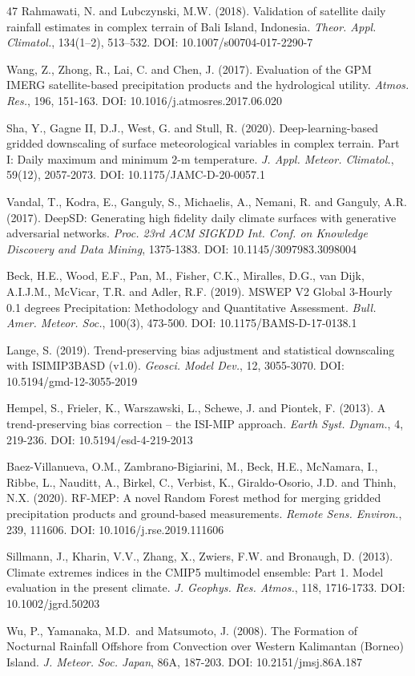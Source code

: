 \documentclass[11pt,a4paper]{article}
\begin{document}
\begin{thebibliography}{47}
 Rahmawati, N. and Lubczynski, M.W. (2018). Validation of
satellite daily rainfall estimates in complex terrain of Bali Island,
Indonesia. \emph{Theor. Appl. Climatol.}, 134(1--2), 513--532. DOI:
10.1007/s00704-017-2290-7

 Wang, Z., Zhong, R., Lai, C. and Chen, J. (2017). Evaluation of
the GPM IMERG satellite-based precipitation products and the
hydrological utility. \emph{Atmos. Res.}, 196, 151-163. DOI:
10.1016/j.atmosres.2017.06.020

 Sha, Y., Gagne II, D.J., West, G. and Stull, R. (2020).
Deep-learning-based gridded downscaling of surface meteorological
variables in complex terrain. Part I: Daily maximum and minimum 2-m
temperature. \emph{J. Appl. Meteor. Climatol.}, 59(12), 2057-2073. DOI:
10.1175/JAMC-D-20-0057.1

 Vandal, T., Kodra, E., Ganguly, S., Michaelis, A., Nemani, R.
and Ganguly, A.R. (2017). DeepSD: Generating high fidelity daily climate
surfaces with generative adversarial networks. \emph{Proc. 23rd ACM
SIGKDD Int. Conf. on Knowledge Discovery and Data Mining}, 1375-1383.
DOI: 10.1145/3097983.3098004

 Beck, H.E., Wood, E.F., Pan, M., Fisher, C.K., Miralles, D.G.,
van Dijk, A.I.J.M., McVicar, T.R. and Adler, R.F. (2019). MSWEP V2
Global 3-Hourly 0.1 degrees Precipitation: Methodology and Quantitative
Assessment. \emph{Bull. Amer. Meteor. Soc.}, 100(3), 473-500. DOI:
10.1175/BAMS-D-17-0138.1

 Lange, S. (2019). Trend-preserving bias adjustment and
statistical downscaling with ISIMIP3BASD (v1.0). \emph{Geosci. Model
Dev.}, 12, 3055-3070. DOI: 10.5194/gmd-12-3055-2019

 Hempel, S., Frieler, K., Warszawski, L., Schewe, J. and
Piontek, F. (2013). A trend-preserving bias correction -- the ISI-MIP
approach. \emph{Earth Syst. Dynam.}, 4, 219-236. DOI:
10.5194/esd-4-219-2013

 Baez-Villanueva, O.M., Zambrano-Bigiarini, M., Beck, H.E.,
McNamara, I., Ribbe, L., Nauditt, A., Birkel, C., Verbist, K.,
Giraldo-Osorio, J.D. and Thinh, N.X. (2020). RF-MEP: A novel Random
Forest method for merging gridded precipitation products and
ground-based measurements. \emph{Remote Sens. Environ.}, 239, 111606.
DOI: 10.1016/j.rse.2019.111606

 Sillmann, J., Kharin, V.V., Zhang, X., Zwiers, F.W. and
Bronaugh, D. (2013). Climate extremes indices in the CMIP5 multimodel
ensemble: Part 1. Model evaluation in the present climate. \emph{J.
Geophys. Res. Atmos.}, 118, 1716-1733. DOI: 10.1002/jgrd.50203

 Wu, P., Yamanaka, M.D.~and Matsumoto, J. (2008). The Formation
of Nocturnal Rainfall Offshore from Convection over Western Kalimantan
(Borneo) Island. \emph{J. Meteor. Soc. Japan}, 86A, 187-203. DOI:
10.2151/jmsj.86A.187


\end{thebibliography}
\end{document}
